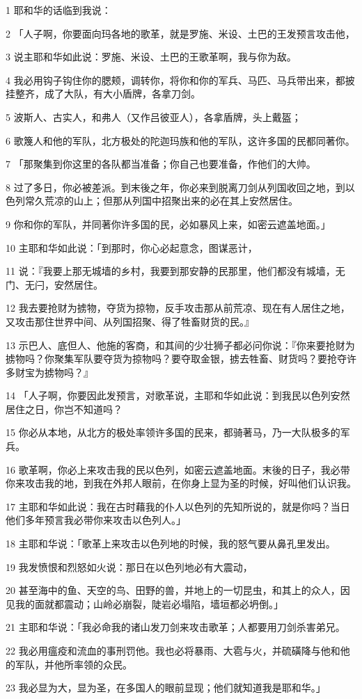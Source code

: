 \par 1 耶和华的话临到我说：
\par 2 「人子啊，你要面向玛各地的歌革，就是罗施、米设、土巴的王发预言攻击他，
\par 3 说主耶和华如此说：罗施、米设、土巴的王歌革啊，我与你为敌。
\par 4 我必用钩子钩住你的腮颊，调转你，将你和你的军兵、马匹、马兵带出来，都披挂整齐，成了大队，有大小盾牌，各拿刀剑。
\par 5 波斯人、古实人，和弗人（又作吕彼亚人），各拿盾牌，头上戴盔；
\par 6 歌篾人和他的军队，北方极处的陀迦玛族和他的军队，这许多国的民都同著你。
\par 7 「那聚集到你这里的各队都当准备；你自己也要准备，作他们的大帅。
\par 8 过了多日，你必被差派。到末後之年，你必来到脱离刀剑从列国收回之地，到以色列常久荒凉的山上；但那从列国中招聚出来的必在其上安然居住。
\par 9 你和你的军队，并同著你许多国的民，必如暴风上来，如密云遮盖地面。」
\par 10 主耶和华如此说：「到那时，你心必起意念，图谋恶计，
\par 11 说：『我要上那无城墙的乡村，我要到那安静的民那里，他们都没有城墙，无门、无闩，安然居住。
\par 12 我去要抢财为掳物，夺货为掠物，反手攻击那从前荒凉、现在有人居住之地，又攻击那住世界中间、从列国招聚、得了牲畜财货的民。』
\par 13 示巴人、底但人、他施的客商，和其间的少壮狮子都必问你说：『你来要抢财为掳物吗？你聚集军队要夺货为掠物吗？要夺取金银，掳去牲畜、财货吗？要抢夺许多财宝为掳物吗？』
\par 14 「人子啊，你要因此发预言，对歌革说，主耶和华如此说：到我民以色列安然居住之日，你岂不知道吗？
\par 15 你必从本地，从北方的极处率领许多国的民来，都骑著马，乃一大队极多的军兵。
\par 16 歌革啊，你必上来攻击我的民以色列，如密云遮盖地面。末後的日子，我必带你来攻击我的地，到我在外邦人眼前，在你身上显为圣的时候，好叫他们认识我。
\par 17 主耶和华如此说：我在古时藉我的仆人以色列的先知所说的，就是你吗？当日他们多年预言我必带你来攻击以色列人。」
\par 18 主耶和华说：「歌革上来攻击以色列地的时候，我的怒气要从鼻孔里发出。
\par 19 我发愤恨和烈怒如火说：那日在以色列地必有大震动，
\par 20 甚至海中的鱼、天空的鸟、田野的兽，并地上的一切昆虫，和其上的众人，因见我的面就都震动；山岭必崩裂，陡岩必塌陷，墙垣都必坍倒。」
\par 21 主耶和华说：「我必命我的诸山发刀剑来攻击歌革；人都要用刀剑杀害弟兄。
\par 22 我必用瘟疫和流血的事刑罚他。我也必将暴雨、大雹与火，并硫磺降与他和他的军队，并他所率领的众民。
\par 23 我必显为大，显为圣，在多国人的眼前显现；他们就知道我是耶和华。」

